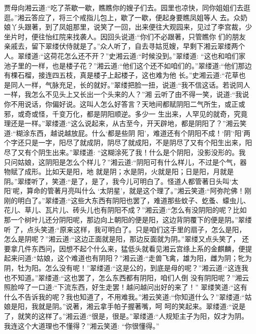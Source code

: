 \begin{parag}
    贾母向湘云道:“吃了茶歇一歇，瞧瞧你的嫂子们去。园里也凉快，同你姐姐们去逛逛。”湘云答应了，将三个戒指儿包上，歇了一歇，便起身要瞧凤姐等人 去。众奶娘丫头跟著，到了凤姐那里，说笑了一回，出来便往大观园来，见过了李宫裁，少坐片时，便往怡红院来找袭人。因回头说道:“你们不必跟著，只管瞧你 们的朋友亲戚去，留下翠缕伏侍就是了。”众人听了，自去寻姑觅嫂，早剩下湘云翠缕两个人。翠缕道:“这荷花怎么还不开？”史湘云道:“时候没到。”翠缕道: “这也和咱们家池子里的一样，也是楼子花？”湘云道:“他们这个还不如咱们的。”翠缕道:“他们那边有棵石榴，接连四五枝，真是楼子上起楼子，这也难为他 长。”史湘云道:“花草也是同人一样，气脉充足，长的就好。”翠缕把脸一扭，说道:“我不信这话。若说同人一样，我怎么不见头上又长出一个头来的人？”湘 云听了由不得一笑，说道:“我说你不用说话，你偏好说。这叫人怎么好答言？天地间都赋阴阳二气所生，或正或邪，或奇或怪，千变万化，都是阴阳顺逆。多少一 生出来，人罕见的就奇，究竟理还是一样。”翠缕道:“这么说起来，从古至今，开天辟地，都是阴阳了？”湘云笑道:“糊涂东西，越说越放屁。什么‘都是些阴 阳’，难道还有个阴阳不成！‘阴’‘阳’两个字还只是一字，阳尽了就成阴，阴尽了就成阳，不是阴尽了又有个阳生出来，阳尽了又有个阴生出来。”翠缕道: “这糊涂死了我！什么是个阴阳，没影没形的。我只问姑娘，这阴阳是怎么个样儿？”湘云道:“阴阳可有什么样儿，不过是个气，器物赋了成形。比如天是阳，地 就是阴；水是阴，火就是阳；日是阳，月就是阴。”翠缕听了，笑道:“是了，是了，我今儿可明白了。怪道人都管著日头叫‘太阳’呢，算命的管著月亮叫什么 ‘太阴星’，就是这个理了。”湘云笑道:“阿弥陀佛！刚刚的明白了。”翠缕道:“这些大东西有阴阳也罢了，难道那些蚊子、虼蚤、蠓虫儿、花儿、草儿、瓦片儿、砖头儿也有阴阳不成？”湘云道:“怎么有没阴阳的呢？比如那一个树叶儿还分阴阳呢，那边向上朝阳的便是阳，这边背阴覆下的便是阴。”翠缕听 了，点头笑道:“原来这样，我可明白了。只是咱们这手里的扇子，怎么是阳，怎么是阴呢？”湘云道:“这边正面就是阳，那边反面就为阴。”翠缕又点头笑了， 还要拿几件东西问，因想不起个什么来，猛低头就看见湘云宫绦上系的金麒麟，便提起来问道:“姑娘，这个难道也有阴阳？”湘云道:“走兽飞禽，雄为阳，雌为阴；牝为阴，牡为阳。怎么没有呢！”翠缕道:“这是公的，到底是母的呢？”湘云道:“这连我也不知道。”翠缕道:“这也罢了，怎么东西都有阴阳，咱们人倒 没有阴阳呢？”湘云照脸啐了一口道:“下流东西，好生走罢！越问越问出好的来了！” 翠缕笑道:“这有什么不告诉我的呢？我也知道了，不用难我。”湘云笑道:“你知道什么？”翠缕道:“姑娘是阳，我就是阴。”说著，湘云拿手帕子握著嘴，呵 呵的笑起来。翠缕道:“说是了，就笑的这样了。”湘云道:“很是，很是。”翠缕道:“人规矩主子为阳，奴才为阴。我连这个大道理也不懂得？”湘云笑道: “你很懂得。”
\end{parag}


